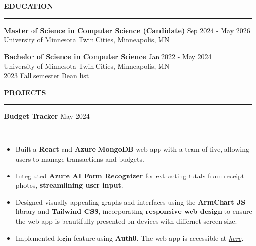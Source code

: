 \documentclass{cv}
\newcommand*{\labelfont}{\fontfamily{bch}\selectfont}
\begin{document}
{\large {\textbf{EDUCATION}}}\vspace*{-6pt}\\
\rule{\textwidth}{0.4pt}
{\labelfont \textbf{Master of Science in Computer Science (Candidate)} \hspace{6.3cm} Sep 2024 - May 2026}\\
{\small University of Minnesota Twin Cities, Minneapolis, MN
\hspace{5.5cm}
}
\vspace*{3pt}

{\labelfont \textbf{Bachelor of Science in Computer Science} \hspace{8.1cm} Jan 2022 - May 2024}\\
{\small University of Minnesota Twin Cities, Minneapolis, MN \hspace{5.5cm}
\vspace{-2.0pt}\\
\small 2023 Fall semester Dean list \hspace{5.5cm}
}

\vspace*{4pt}
{\large {\textbf{PROJECTS}}}\vspace*{-6pt}\\
\rule{\textwidth}{0.4pt}
{\labelfont \textbf{Budget Tracker} \hspace*{14.4cm}\hspace{1.5mm}\hspace{1.5mm}May 2024}
{
\small
\vspace{-26pt}\\
\begin{itemize}
\setlength\itemsep{-2.5pt}
    \item Built a \textbf{React} and \textbf{Azure MongoDB} web app with a team of five, allowing users to manage transactions and budgets.
    \item Integrated \textbf{Azure AI Form Recognizer} for extracting totals from receipt photos, \textbf{streamlining user input}.
    \item Designed visually appealing graphs and interfaces using the \textbf{ArmChart JS} library and \textbf{Tailwind CSS}, incorporating \textbf{responsive web design} to ensure the web app is beautifully presented on devices with differnet screen size.
    \item Implemented login feature using \textbf{Auth0}. The web app is accessible at \textit{\href{https://nice-ocean-02cf72b0f.5.azurestaticapps.net} {here}.}
\end{itemize}
}
\end{document}
